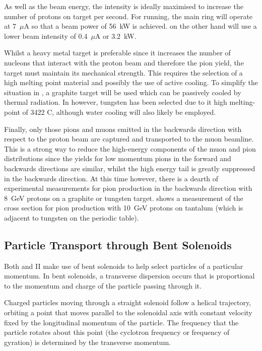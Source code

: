 As well as the beam energy, the intensity is ideally maximised to increase the number of protons on target per second.
For \phaseII running, the main ring will operate at 7~$\mu$A so that a beam power of 56~kW is achieved.  
\phaseI on the other hand will use a lower beam intensity of 0.4~$\mu$A or 3.2~kW.

Whilst a heavy metal target is preferable since it increases the number of nucleons that interact with the proton beam and therefore the pion yield,
the target must maintain its mechanical strength.
This requires the selection of a high melting point material and possibly the use of active cooling.
To simplify the situation in \phaseI, a graphite target will be used which can be passively cooled by thermal radiation.
In \phaseII however, tungsten has been selected due to it high melting-point of 3422 C, although water cooling will also likely be employed.

\FigPionSpectraVsAngle

Finally, only those pions and muons emitted in the backwards direction with respect to the proton beam are captured and transported to the muon beamline.
This is a strong way to reduce the high-energy components of the muon and pion distributions since the yields for low momentum pions in the forward and backwards directions are similar, whilst the high energy tail is greatly suppressed in the backwards direction.
At this time however, there is a dearth of experimental measurements for pion production in the backwards direction with 8~GeV protons on a graphite or tungsten target.
 shows a measurement of the cross section for pion production with 10~GeV protons on tantalum (which is adjacent to tungsten on the periodic table).

\subsection{Particle Transport through Bent Solenoids}
Both \phaseI and II make use of bent solenoids to help select particles of a particular momentum.
In bent solenoids, a transverse dispersion occurs that is proportional to the momentum and charge of the particle passing through it.

Charged particles moving through a straight solenoid follow a helical
trajectory, orbiting a point that moves parallel to the solenoidal axis with constant velocity fixed by the longitudinal momentum of the particle.
The frequency that the particle rotates about this point (the cyclotron frequency or frequency of gyration) is determined by the transverse momentum.
\FigBentSolenoidRelativeDrift

